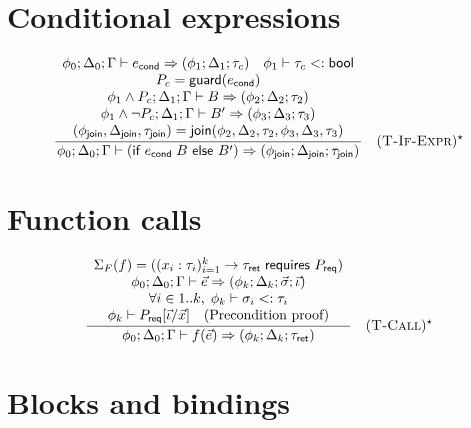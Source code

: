 \section*{Conditional expressions}

$$
  \frac{
    \begin{array}{c}
      \phi_0; \Delta_0; \Gamma \vdash e_\textsf{cond} \Rightarrow (\phi_1; \Delta_1; \tau_c) \quad \phi_1 \vdash \tau_c <: \textsf{bool} \\
      P_c = \mathsf{guard}(e_\textsf{cond})                                                                                              \\
      \phi_1 \wedge P_c; \Delta_1; \Gamma \vdash B \Rightarrow (\phi_2; \Delta_2; \tau_2)                                                \\
      \phi_1 \wedge \neg P_c; \Delta_1; \Gamma \vdash B' \Rightarrow (\phi_3; \Delta_3; \tau_3)                                          \\
      (\phi_\textsf{join}, \Delta_\textsf{join}, \tau_\textsf{join}) = \textsf{join}(\phi_2, \Delta_2, \tau_2, \phi_3, \Delta_3, \tau_3)
    \end{array}
  }{
    \phi_0; \Delta_0; \Gamma \vdash (\textsf{if } e_\textsf{cond}\; B \textsf{ else } B') \Rightarrow (\phi_\textsf{join}; \Delta_\textsf{join}; \tau_\textsf{join})
  } \quad (\textsc{T-If-Expr})^\star
$$

\section*{Function calls}

$$
  \frac{
    \begin{array}{c}
      \Sigma_F(f) = ( (x_i:\tau_i)_{i=1}^k \rightarrow \tau_\textsf{ret}\; \textsf{requires } P_\textsf{req} ) \\
      \phi_0; \Delta_0; \Gamma \vdash \vec{e} \Rightarrow (\phi_k; \Delta_k; \vec{\sigma}; \vec{\iota})        \\
      \forall i \in 1..k,\; \phi_k \vdash \sigma_i <: \tau_i                                                   \\
      \phi_k \vdash P_\textsf{req}[\vec{\iota} / \vec{x}] \quad \text{(Precondition proof)}
    \end{array}
  }{
    \phi_0; \Delta_0; \Gamma \vdash f(\vec{e}) \Rightarrow (\phi_k; \Delta_k; \tau_\textsf{ret})
  } \quad (\textsc{T-Call})^\star
$$

\section*{Blocks and bindings}

